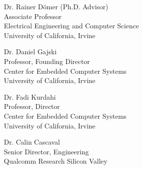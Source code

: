 

%
%
Dr. Rainer D\"{o}mer (Ph.D. Advisor) \\
Associate Professor\\
Electrical Engineering and Computer Science\\
University of California, Irvine\\
\vspace{5mm}

Dr. Daniel Gajski \\
Professor, Founding Director\\
Center for Embedded Computer Systems\\
University of California, Irvine\\
\vspace{5mm}

Dr. Fadi Kurdahi\\
Professor, Director\\
Center for Embedded Computer Systems\\
University of California, Irvine\\
\vspace{5mm}

Dr. Calin Cascaval\\
Senior Director, Engineering \\
Qualcomm Research Silicon Valley \\
\vspace{5mm}

